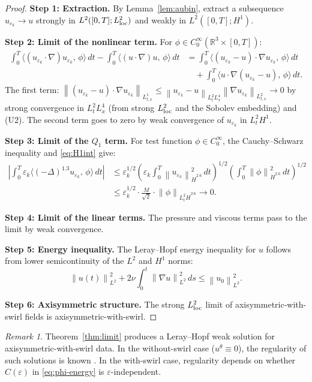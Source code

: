 \documentclass{article}
\theoremstyle{definition}
\theoremstyle{remark}
\newtheorem{remark}[theorem]{Remark}
\newcommand{\R}{\mathbb{R}}
\newcommand{\e}{\varepsilon}
\newcommand{\norm}[1]{\left\|#1\right\|}
\newcommand{\inner}[2]{\langle #1,\, #2\rangle}
\begin{document}
\begin{proof}
  \textbf{Step 1: Extraction.}
  By Lemma~\ref{lem:aubin}, extract a subsequence
  $u_{\e_k}\to u$ strongly in $L^2([0,T];L^2_{\rm loc})$ and weakly
  in $L^2([0,T];H^1)$.

  \textbf{Step 2: Limit of the nonlinear term.}
  For $\phi\in C_0^\infty(\R^3\times[0,T])$:
  \begin{align*}
    \int_0^T\inner{(u_{\e_k}\cdot\nabla)u_{\e_k}}{\phi}\,dt
    -\int_0^T\inner{(u\cdot\nabla)u}{\phi}\,dt
    &= \int_0^T\inner{(u_{\e_k}-u)\cdot\nabla u_{\e_k}}{\phi}\,dt\\
    &\quad + \int_0^T\inner{u\cdot\nabla(u_{\e_k}-u)}{\phi}\,dt.
  \end{align*}
  The first term: $\norm{(u_{\e_k}-u)\cdot\nabla u_{\e_k}}_{L^1_{t,x}}
  \le \norm{u_{\e_k}-u}_{L^2_t L^4_x}\norm{\nabla u_{\e_k}}_{L^2_{t,x}}\to 0$
  by strong convergence in $L^2_t L^4_x$ (from strong $L^2_{\rm loc}$
  and the Sobolev embedding) and (U2).
  The second term goes to zero by weak convergence of $u_{\e_k}$ in
  $L^2_t H^1$.

  \textbf{Step 3: Limit of the $Q_1$ term.}
  For test function $\phi\in C_0^\infty$, the Cauchy--Schwarz inequality and
  \eqref{eq:H1int} give:
  \begin{align*}
    \left|\int_0^T\e_k\inner{(-\Delta)^{1.3}u_{\e_k}}{\phi}\,dt\right|
    &\le \e_k^{1/2}
      \left(\e_k\int_0^T\norm{u_{\e_k}}_{\dot H^{2.6}}^2\,dt\right)^{1/2}
      \left(\int_0^T\norm{\phi}_{\dot H^{2.6}}^2\,dt\right)^{1/2}\\
    &\le \e_k^{1/2}\cdot\frac{M}{\sqrt{2}}
      \cdot\norm{\phi}_{L^2_t \dot H^{2.6}} \to 0.
  \end{align*}

  \textbf{Step 4: Limit of the linear terms.}
  The pressure and viscous terms pass to the limit by weak convergence.

  \textbf{Step 5: Energy inequality.}
  The Leray--Hopf energy inequality for $u$ follows from lower
  semicontinuity of the $L^2$ and $H^1$ norms:
  \[
    \norm{u(t)}_{L^2}^2 + 2\nu\int_0^t\norm{\nabla u}_{L^2}^2\,ds
    \le \norm{u_0}_{L^2}^2.
  \]

  \textbf{Step 6: Axisymmetric structure.}
  The strong $L^2_{\rm loc}$ limit of axisymmetric-with-swirl fields is
  axisymmetric-with-swirl.
\end{proof}

\begin{remark}
  Theorem~\ref{thm:limit} produces a Leray--Hopf weak solution for
  axisymmetric-with-swirl data.  In the without-swirl case ($u^\theta\equiv 0$),
  the regularity of such solutions is known
  \cite{Ladyzhenskaya,UY1968}.  In the with-swirl case, regularity depends
  on whether $C(\e)$ in \eqref{eq:phi-energy} is $\e$-independent.
\end{remark}
\end{document}
